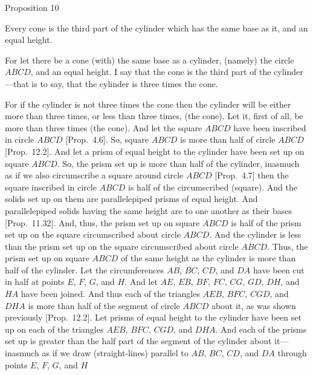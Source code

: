 
\begin{center}
{\large Proposition 10}
\end{center}

Every cone is the third part of the cylinder which has the same base as it, and an equal height.

For let there be a cone (with) the same base as a cylinder, (namely) the circle $ABCD$, and an equal height. I say that the cone is
the third part of the cylinder---that is to say, that the cylinder is three times the cone.

\epsfysize=2.5in
\centerline{}

For if the cylinder is not three times the cone then the cylinder will be either more than three times, or less than three times, (the cone). Let it, first
of all, be  more than three times (the cone). And  let the square $ABCD$ have been inscribed in circle $ABCD$ [Prop.~4.6].
So, square $ABCD$ is more than half of circle $ABCD$  [Prop.~12.2]. And let a prism
of equal height to the cylinder have been set up on square $ABCD$. So, the prism set up is more than half of the
cylinder, inasmuch as  if we also circumscribe a square around circle $ABCD$ [Prop.~4.7] then the square inscribed in circle $ABCD$ is half of the circumscribed (square). And the  solids  set up on them are parallelepiped
prisms  of equal height.  And parallelepiped solids having the same height are to one
another as their bases [Prop.~11.32]. And, thus, the prism set up on square $ABCD$ is half
of the prism set up on the square circumscribed about circle $ABCD$. And the cylinder is less than the prism
set up on the square circumscribed about circle $ABCD$. Thus, the prism set up on square $ABCD$ of the
same height as the cylinder is more than half of the cylinder. Let the circumferences $AB$, $BC$, $CD$, and $DA$
have been cut in half at points $E$, $F$, $G$, and $H$. And let $AE$, $EB$, $BF$, $FC$, $CG$, $GD$, $DH$,
and $HA$ have been joined. And thus each of the triangles $AEB$, $BFC$, $CGD$, and $DHA$ is more than
half of the segment of circle $ABCD$ about it, as was shown previously [Prop.~12.2].
Let prisms of equal height to the cylinder have been set up on each of the triangles $AEB$, $BFC$, $CGD$,
and $DHA$.  And each of the prisms set up is greater than the half part of the segment of the cylinder about it---inasmuch
as if we  draw (straight-lines) parallel to $AB$, $BC$, $CD$, and $DA$ through points $E$, $F$, $G$, and $H$
